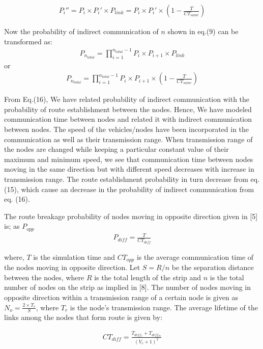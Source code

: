 \documentclass[journal]{IEEEtran}
\begin{document}
\begin{eqnarray}
P_{i}''=P_{i}\times P_{i}' \times P_{link}=P_{i}\times P_{i}' \times (1-\frac{T}{CT_{same}})
\end{eqnarray}


Now the probability of indirect communication of $n$ shown  in eq.(9) can be transformed as:
\begin{eqnarray}
P_{n_{total}}= \prod_{i=1}^{n_{total}-1}P_{i}\times P_{i+1}\times P_{link}
\end{eqnarray}
or
\begin{eqnarray}
P_{n_{total}}= \prod_{i=1}^{n_{total}-1}P_{i}\times P_{i+1}\times (1-\frac{T}{CT_{same}})
\end{eqnarray}

From Eq.(16), We have related probability of indirect communication with the probability of route establishment between the nodes. Hence, We have modeled communication time between nodes and related it with indirect communication between nodes. The speed of the vehicles/nodes have been incorporated in the communication as well as their transmission range.  When transmission range of the nodes are changed while keeping a particular constant value of their maximum and minimum speed, we see that communication time between nodes moving in the same direction but with different speed decreases with increase in transmission range.  The route establishment probability in turn decrease from eq. (15), which cause an decrease in the probability of indirect communication from eq. (16).

The route breakage probability of nodes moving in opposite direction given in [5] is; as $P_{opp}$
\begin{eqnarray}
P_{diff}=\frac{T}{CT_{diff}}
\end{eqnarray}

where, $T$ is the simulation time and $CT_{opp}$ is the average communication time of the nodes moving in opposite direction.
Let $ S=R/n $ be the separation distance between the nodes, where $R$ is the total length of the strip and $n$ is the total number of nodes on the strip as implied in [8]. The number of nodes moving in opposite direction within a transmission range of a certain node is given as $ N_{o} = \frac{2\times T_{r}}{S} $, where $T_{r}$ is the node's transmission range. The average lifetime of the links among the nodes that form route is given by:

\begin{eqnarray}
CT_{diff} = \frac{T_{diff_{s}} + T_{diff_{ds}}}{(V_{c}+1)^2}
\end{eqnarray}
\end{document}
